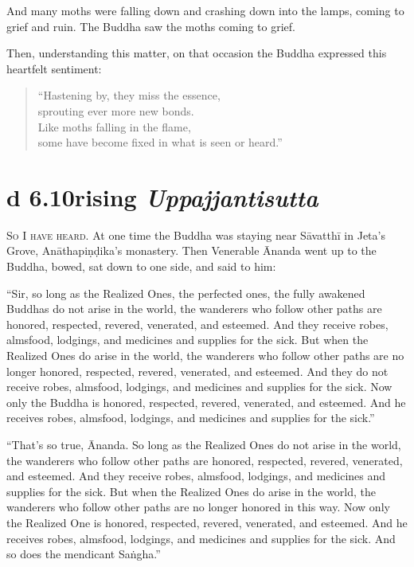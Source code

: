 \documentclass[12pt,openany]{book}%
\newcommand*{\suttatitleacronym}[1]{\smaller[2]{#1}\vspace*{.3em}}
\newcommand*{\suttatitletranslation}[1]{\linebreak{#1}}
\newcommand*{\suttatitleroot}[1]{\linebreak\smaller[2]\itshape{#1}}
\newcommand*{\tocacronym}[1]{\hspace*{-3.3em}{#1}\quad}
\newcommand*{\toctranslation}[1]{#1}
\newcommand*{\tocroot}[1]{(\textit{#1})}
\newcommand*{\scevam}[1]{\textsc{#1}}
\begin{document}
And many moths were falling down and crashing down into the lamps, coming to grief and ruin. The Buddha saw the moths coming to grief. 

Then, understanding this matter, on that occasion the Buddha expressed this heartfelt sentiment: 

\begin{verse}%
“Hastening by, they miss the essence, \\
sprouting ever more new bonds. \\
Like moths falling in the flame, \\
some have become fixed in what is seen or heard.” 

%
\end{verse}

%
\section*{{\suttatitleacronym Ud 6.10}{\suttatitletranslation Arising }{\suttatitleroot Uppajjantisutta}}
\addcontentsline{toc}{section}{\tocacronym{Ud 6.10} \toctranslation{Arising } \tocroot{Uppajjantisutta}}

\scevam{So I have heard. }At one time the Buddha was staying near \textsanskrit{Sāvatthī} in Jeta’s Grove, \textsanskrit{Anāthapiṇḍika}’s monastery. Then Venerable Ānanda went up to the Buddha, bowed, sat down to one side, and said to him: 

“Sir, so long as the Realized Ones, the perfected ones, the fully awakened Buddhas do not arise in the world, the wanderers who follow other paths are honored, respected, revered, venerated, and esteemed. And they receive robes, almsfood, lodgings, and medicines and supplies for the sick. But when the Realized Ones do arise in the world, the wanderers who follow other paths are no longer honored, respected, revered, venerated, and esteemed. And they do not receive robes, almsfood, lodgings, and medicines and supplies for the sick. Now only the Buddha is honored, respected, revered, venerated, and esteemed. And he receives robes, almsfood, lodgings, and medicines and supplies for the sick.” 

“That’s so true, Ānanda. So long as the Realized Ones do not arise in the world, the wanderers who follow other paths are honored, respected, revered, venerated, and esteemed. And they receive robes, almsfood, lodgings, and medicines and supplies for the sick. But when the Realized Ones do arise in the world, the wanderers who follow other paths are no longer honored in this way. Now only the Realized One is honored, respected, revered, venerated, and esteemed. And he receives robes, almsfood, lodgings, and medicines and supplies for the sick. And so does the mendicant \textsanskrit{Saṅgha}.” 
\end{document}

